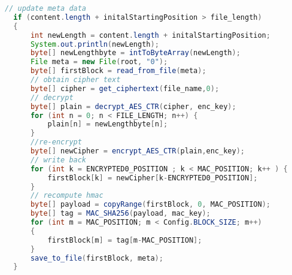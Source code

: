 \documentclass[a4paper,10pt]{article}
\begin{document}
\begin{enumerate}
  \begin{lstlisting}[linewidth=\columnwidth,breaklines=true,language=Java]
  // update meta data
  if (content.length + initalStartingPosition > file_length) 
  {
      int newLength = content.length + initalStartingPosition;
      System.out.println(newLength);
      byte[] newLengthbyte = intToByteArray(newLength);
      File meta = new File(root, "0");
      byte[] firstBlock = read_from_file(meta);
      // obtain cipher text
      byte[] cipher = get_ciphertext(file_name,0);
      // decrypt
      byte[] plain = decrypt_AES_CTR(cipher, enc_key);
      for (int n = 0; n < FILE_LENGTH; n++) {
          plain[n] = newLengthbyte[n]; 
      }
      //re-encrypt
      byte[] newCipher = encrypt_AES_CTR(plain,enc_key);
      // write back
      for (int k = ENCRYPTED0_POSITION ; k < MAC_POSITION; k++ ) {
          firstBlock[k] = newCipher[k-ENCRYPTED0_POSITION];
      }
      // recompute hmac
      byte[] payload = copyRange(firstBlock, 0, MAC_POSITION);
      byte[] tag = MAC_SHA256(payload, mac_key);
      for (int m = MAC_POSITION; m < Config.BLOCK_SIZE; m++) 
      {
          firstBlock[m] = tag[m-MAC_POSITION];
      }
      save_to_file(firstBlock, meta);
  }\end{lstlisting}
\end{enumerate}
\end{document}
